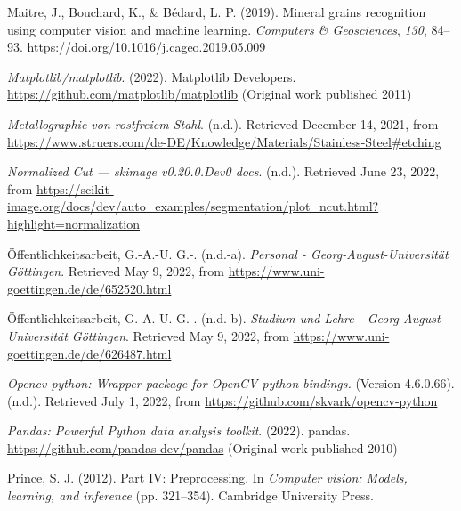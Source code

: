 \documentclass[
  12pt,
]{book}
\newlength{\cslhangindent}
\newlength{\cslentryspacingunit} %
\newenvironment{CSLReferences}[2] %
 {%
  \setlength{\parindent}{0pt}
  \ifodd #1
  \let\oldpar\par
  \def\par{\hangindent=\cslhangindent\oldpar}
  \fi
  \setlength{\parskip}{#2\cslentryspacingunit}
 }%
 {}
\begin{document}
\begin{CSLReferences}{1}{0}
\leavevmode{}%
Maitre, J., Bouchard, K., \& Bédard, L. P. (2019). Mineral grains recognition using computer vision and machine learning. \emph{Computers \& Geosciences}, \emph{130}, 84--93. \url{https://doi.org/10.1016/j.cageo.2019.05.009}

\leavevmode{}%
\emph{Matplotlib/matplotlib}. (2022). {Matplotlib Developers}. \url{https://github.com/matplotlib/matplotlib} (Original work published 2011)

\leavevmode{}%
\emph{Metallographie von rostfreiem Stahl}. (n.d.). Retrieved December 14, 2021, from \url{https://www.struers.com/de-DE/Knowledge/Materials/Stainless-Steel\#etching}

\leavevmode{}%
\emph{Normalized {Cut} --- skimage v0.20.0.Dev0 docs}. (n.d.). Retrieved June 23, 2022, from \url{https://scikit-image.org/docs/dev/auto_examples/segmentation/plot_ncut.html?highlight=normalization}

\leavevmode{}%
Öffentlichkeitsarbeit, G.-A.-U. G.-. (n.d.-a). \emph{Personal - Georg-August-Universität Göttingen}. Retrieved May 9, 2022, from \url{https://www.uni-goettingen.de/de/652520.html}

\leavevmode{}%
Öffentlichkeitsarbeit, G.-A.-U. G.-. (n.d.-b). \emph{Studium und Lehre - Georg-August-Universität Göttingen}. Retrieved May 9, 2022, from \url{https://www.uni-goettingen.de/de/626487.html}

\leavevmode{}%
\emph{Opencv-python: {Wrapper} package for {OpenCV} python bindings.} (Version 4.6.0.66). (n.d.). Retrieved July 1, 2022, from \url{https://github.com/skvark/opencv-python}

\leavevmode{}%
\emph{Pandas: Powerful {Python} data analysis toolkit}. (2022). {pandas}. \url{https://github.com/pandas-dev/pandas} (Original work published 2010)

\leavevmode{}%
Prince, S. J. (2012). Part {IV}: {Preprocessing}. In \emph{Computer vision: Models, learning, and inference} (pp. 321--354). {Cambridge University Press}.


\end{CSLReferences}
\end{document}
